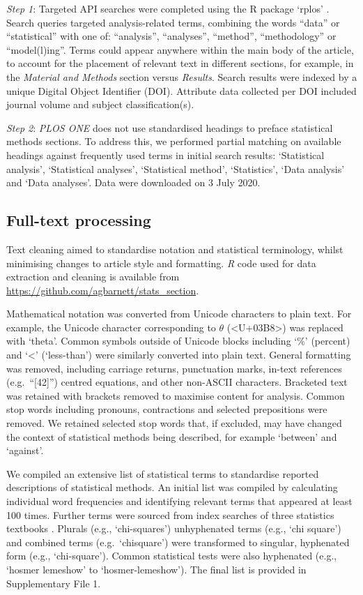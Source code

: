\documentclass[12pt]{article}
\begin{document}
\emph{Step 1}: Targeted API searches were completed using the R package
`rplos' \citep{rplos}. Search queries targeted analysis-related terms,
combining the words ``data'' or ``statistical'' with one of:
``analysis'', ``analyses'', ``method'', ``methodology'' or
``model(l)ing''. Terms could appear anywhere within the main body of the
article, to account for the placement of relevant text in different
sections, for example, in the \emph{Material and Methods} section versus
\emph{Results}. Search results were indexed by a unique Digital Object
Identifier (DOI). Attribute data collected per DOI included journal
volume and subject classification(s).

\emph{Step 2}: \emph{PLOS ONE} does not use standardised headings
to preface statistical methods sections. To address this, we performed
partial matching on available headings against frequently used terms in
initial search results: `Statistical analysis', `Statistical analyses',
`Statistical method', `Statistics', `Data analysis' and `Data analyses'. Data were downloaded on 3 July 2020.

\subsection{Full-text processing}
\label{sec:methods-cleaning}

Text cleaning aimed to standardise notation and statistical terminology,
whilst minimising changes to article style and formatting. \emph{R} code
used for data extraction and cleaning is available from
\url{https://github.com/agbarnett/stats_section}.

Mathematical notation was converted from Unicode characters to plain
text. For example, the Unicode character corresponding to \(\theta\)
(\textless U+03B8\textgreater) was replaced with `theta'. Common symbols
outside of Unicode blocks including `\%' (percent) and `\textless{}'
(`less-than') were similarly converted into plain text. General
formatting was removed, including carriage returns, punctuation marks,
in-text references (e.g.~``{[}42{]}'') centred equations, and other
non-ASCII characters. Bracketed text was retained with brackets removed to
maximise content for analysis. Common stop words
including pronouns, contractions and selected prepositions were removed.
We retained selected stop words that, if excluded, may have changed the
context of statistical methods being described, for example `between'
and `against'.

We compiled an extensive list of statistical terms to standardise
reported descriptions of statistical methods. An initial list was
compiled by calculating individual word frequencies and identifying
relevant terms that appeared at least 100 times. Further terms were
sourced from index searches of three statistics textbooks
\citep{Diggle2013,Bland2015,Dobson2018}. Plurals (e.g.,
`chi-squares') unhyphenated terms (e.g., `chi square') and combined terms
(e.g.~`chisquare') were transformed to singular, hyphenated form
(e.g., `chi-square'). Common statistical tests were also hyphenated
(e.g., `hosmer lemeshow' to `hosmer-lemeshow'). The final list is
provided in Supplementary File 1.
\end{document}
